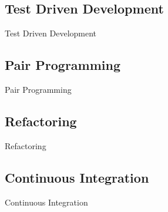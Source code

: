 \subsection{Test Driven Development}\label{subsec:test-driven-development}
Test Driven Development

\subsection{Pair Programming}\label{subsec:pair-programming}
Pair Programming

\subsection{Refactoring}\label{subsec:refactoring}
Refactoring

\subsection{Continuous Integration}\label{subsec:continuous-integration}
Continuous Integration
